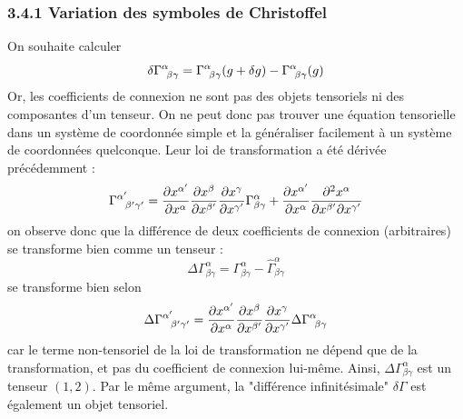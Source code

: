 \subsubsection{3.4.1 Variation des symboles de Christoffel}
On souhaite calculer
\begin{equation}
    \delta \Gamma\indices{^{\alpha}_{\!\beta \gamma}} = \Gamma\indices{^{\alpha}_{\!\beta \gamma}}(g + \delta g) - \Gamma\indices{^{\alpha}_{\!\beta \gamma}}(g)
\end{equation}
Or, les coefficients de connexion ne sont pas des objets tensoriels ni des composantes d'un tenseur. On ne peut donc pas trouver une équation tensorielle dans un système de coordonnée simple et la généraliser facilement à un système de coordonnées quelconque. Leur loi de transformation a été dérivée précédemment :
\begin{equation}
    \Gamma\indices{^{\alpha '}_{\!\beta ' \gamma '}} = \frac{\partial x^{\alpha '}}{\partial x^{\alpha}}\frac{\partial x^{\beta }}{\partial x^{\beta '}}\frac{\partial x^{\gamma }}{\partial x^{\gamma '}}\Gamma^{\alpha}_{\beta \gamma} + \frac{\partial x^{\alpha '}}{\partial x^{\alpha}}\frac{\partial^2 x^{\alpha}}{\partial x^{\beta '} \partial x^{\gamma '}}
\end{equation}
on observe donc que la différence de deux coefficients de connexion (arbitraires) se transforme bien comme un tenseur : 
\begin{equation}
    \Delta \Gamma^{\alpha}_{\beta \gamma} = \Gamma^{\alpha}_{\beta \gamma} - \hat{\Gamma}^{\alpha}_{\beta \gamma} 
\end{equation}
se transforme bien selon
\begin{equation}
    \Delta \Gamma\indices{^{\alpha '}_{\!\beta' \gamma'}} = \frac{\partial x^{\alpha '}}{\partial x^{\alpha}}\frac{\partial x^{\beta }}{\partial x^{\beta '}}\frac{\partial x^{\gamma }}{\partial x^{\gamma '}}\Delta\Gamma\indices{^{\alpha}_{\!\beta \gamma}}
\end{equation}
car le terme non-tensoriel de la loi de transformation ne dépend que de la transformation, et pas du coefficient de connexion lui-même. Ainsi, $\Delta \Gamma^{\alpha}_{\beta \gamma}$ est un tenseur $(1,2)$. Par le même argument, la "différence infinitésimale" $\delta \Gamma$ est également un objet tensoriel.

